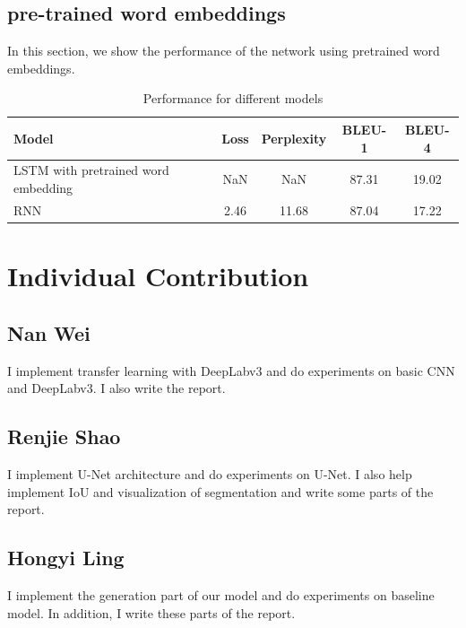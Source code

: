\documentclass{article} %
\begin{document}
\subsection{pre-trained word embeddings}
In this section, we show the performance of the network using pretrained word embeddings.


\begin{table}[!htb]
    \centering
    \begin{tabular}{l|c|c|c|c}
        \hline
        Model & Loss & Perplexity & BLEU-1 & BLEU-4 \\
		\hline
        LSTM with pretrained word embedding& NaN & NaN &87.31&19.02\\\hline
        RNN & 2.46 & 11.68 & 87.04 & 17.22 \\
	    \hline
    \end{tabular}
    \caption{Performance for different models}
    \label{acc}
\end{table}

\section{Individual Contribution}

\subsection*{Nan Wei}
I implement transfer learning with DeepLabv3 and do experiments on basic CNN and DeepLabv3. I also write the report.

\subsection*{Renjie Shao}
I implement U-Net architecture and do experiments on U-Net. I also help implement IoU and visualization of segmentation and write some parts of the report.
\subsection*{Hongyi Ling}
I implement the generation part of our model and do experiments on baseline model.  In addition, I write these parts of the report.



\end{document}
